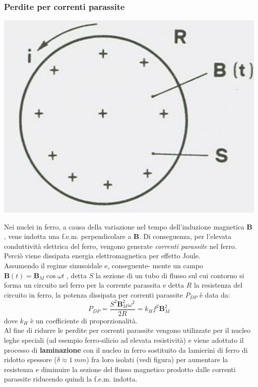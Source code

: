 \documentclass{article}
\begin{document}
\subsubsection*{Perdite per correnti parassite}
\begin{center}
    \includegraphics[scale=0.24]{Image/Nucleo_ferro.png}
\end{center}
Nei nuclei in ferro, a causa della variazione nel
tempo dell'induzione magnetica $\mathbf{B}$, vene indotta una f.e.m. perpendicolare a $\mathbf{B}$. Di  conseguenza, per l'elevata conduttività elettrica del ferro, vengono generate \textit{correnti parassite} nel ferro. Perciò viene dissipata energia elettromagnetica per effetto Joule.\\
Assumendo il regime sinusoidale e, conseguente-
mente un campo $\mathbf{B}(t) = \mathbf{B}_M \cos \omega t$ , detta $S$ la sezione di un tubo di flusso sul cui contorno si forma un circuito nel ferro per la corrente parassita e detta $R$ la
resistenza del circuito in ferro, la potenza dissipata per correnti parassite $P_{DP}$ è
data da:
\[
    P_{DP} =\frac{S^2\mathbf{B}_M^2 \omega^2}{2R} = k_H f^2 \mathbf{B}_M^2
\]
dove $k_H$ è un coefficiente di proporzionalità.\\
Al fine di ridurre le perdite per correnti parassite vengono utilizzate per il nucleo leghe speciali (ad esempio ferro-silicio ad elevata resistività) e viene adottato il processo di
\textbf{laminazione} con il nucleo in ferro sostituito da lamierini di ferro di ridotto spessore ($\delta \approx 1 \ mm$) fra loro isolati (vedi figura) per aumentare la resistenza e diminuire la sezione del flusso magnetico prodotto dalle correnti parassite riducendo quindi la f.e.m. indotta.
\end{document}
